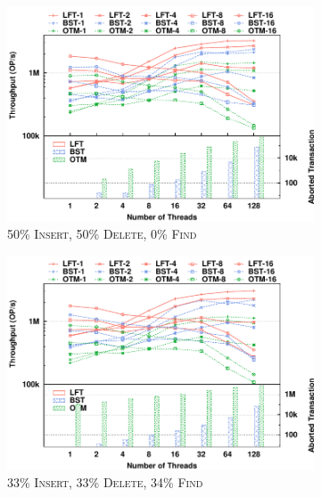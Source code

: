 \documentclass[10pt,conference,compsocconf]{IEEEtran}
\begin{document}
\begin{figure}[t]
    \begin{subfigure}{0.325\textwidth}
        \centering
        \includegraphics[width=1\columnwidth]{./data/amdskip50ins10kfilled.pdf}
        \caption{50\% \textsc{Insert}, 50\% \textsc{Delete}, 0\% \textsc{Find}}
        \label{fig:txnskip50}
    \end{subfigure}
    \hfill
    \begin{subfigure}{0.325\textwidth}
        \centering
        \includegraphics[width=1\columnwidth]{./data/amdskip33ins10kfilled.pdf}
        \caption{33\% \textsc{Insert}, 33\% \textsc{Delete}, 34\% \textsc{Find}}
        \label{fig:txnskip33}
    \end{subfigure}
    \hfill
    \begin{subfigure}{0.325\textwidth}

\end{subfigure}
\end{figure}
\end{document}
